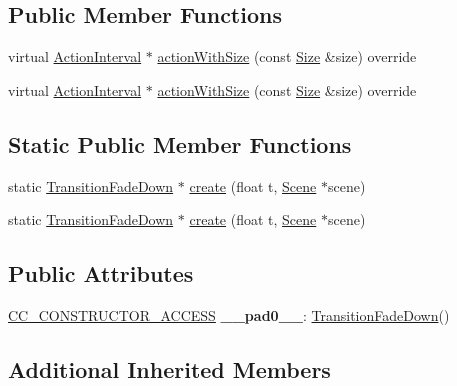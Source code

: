 \subsection*{Public Member Functions}
\begin{DoxyCompactItemize}
\item 
virtual \hyperlink{classActionInterval}{Action\+Interval} $\ast$ \hyperlink{classTransitionFadeDown_aa0c84d6a674134fc9a24d9e796f7cc0b}{action\+With\+Size} (const \hyperlink{classSize}{Size} \&size) override
\item 
virtual \hyperlink{classActionInterval}{Action\+Interval} $\ast$ \hyperlink{classTransitionFadeDown_a7cc0da579b09b7595ea875acdccb94e3}{action\+With\+Size} (const \hyperlink{classSize}{Size} \&size) override
\end{DoxyCompactItemize}
\subsection*{Static Public Member Functions}
\begin{DoxyCompactItemize}
\item 
static \hyperlink{classTransitionFadeDown}{Transition\+Fade\+Down} $\ast$ \hyperlink{classTransitionFadeDown_a4893a2797134bd7d35b0ead3913dadea}{create} (float t, \hyperlink{classScene}{Scene} $\ast$scene)
\item 
static \hyperlink{classTransitionFadeDown}{Transition\+Fade\+Down} $\ast$ \hyperlink{classTransitionFadeDown_afa49b3a7a85d5a0dd1e1e2533a11c63e}{create} (float t, \hyperlink{classScene}{Scene} $\ast$scene)
\end{DoxyCompactItemize}
\subsection*{Public Attributes}
\begin{DoxyCompactItemize}
\item 
\mbox{\label{classTransitionFadeDown_a155d8c82de1034272432b0d572f5a297}} 
\hyperlink{_2cocos2d_2cocos_2base_2ccConfig_8h_a25ef1314f97c35a2ed3d029b0ead6da0}{C\+C\+\_\+\+C\+O\+N\+S\+T\+R\+U\+C\+T\+O\+R\+\_\+\+A\+C\+C\+E\+SS} {\bfseries \+\_\+\+\_\+pad0\+\_\+\+\_\+}\+: \hyperlink{classTransitionFadeDown}{Transition\+Fade\+Down}()
\end{DoxyCompactItemize}
\subsection*{Additional Inherited Members}



